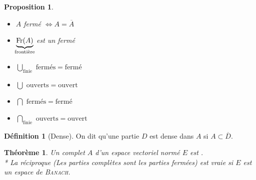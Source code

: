 \documentclass[11pt,a4paper]{report}
\newtheorem{itheorem}[theorem]{Théorème}
\newtheorem{prop}[theorem]{Proposition}
\theoremstyle{definition}
\newtheorem{dfn}[theorem]{Définition}
\begin{document}
\begin{prop}
\begin{itemize}
\item $A$ fermé $\Leftrightarrow A=\overline{A}$
\item $\underbrace{\mathrm{Fr}(A)}_{\mathclap{\text{frontière}}}$ est un fermé
\item $\bigcup_{\text{finie}} \text{ fermés} = \text{fermé}$
\item $\bigcup \text{ ouverts} = \text{ouvert}$
\item $\bigcap \text{ fermés} = \text{fermé}$
\item $\bigcap_{\text{finie}} \text{ ouverts} = \text{ouvert}$
\end{itemize}
\end{prop}
\begin{dfn}[Dense]
     On dit qu'une partie $D$ est dense dans $A$ si $A \subset \overline{D}$.
\end{dfn}
\begin{itheorem}
    Un \emph{complet} $A$ d'un espace vectoriel normé $E$ est .\\*
    La réciproque (\textit{Les parties complètes sont les parties fermées}) est vraie si $E$ est un espace de \textsc{Banach}.
\end{itheorem}

\end{document}
